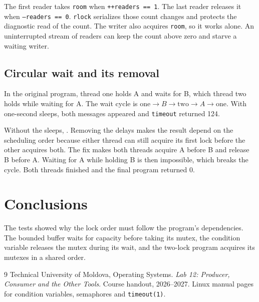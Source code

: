 The first reader takes \texttt{room} when \texttt{++readers == 1}. The last reader releases it when \texttt{--readers == 0}. \texttt{rlock} serializes those count changes and protects the diagnostic read of the count. The writer also acquires \texttt{room}, so it works alone. An uninterrupted stream of readers can keep the count above zero and starve a waiting writer.

\clearpage
\section{Circular wait and its removal}

In the original program, thread one holds A and waits for B, which thread two holds while waiting for A. The wait cycle is \(\mathrm{one}\to B\to\mathrm{two}\to A\to\mathrm{one}\). With one-second sleeps, both messages appeared and \texttt{timeout} returned 124.


Without the sleeps, \NoSleepResults. Removing the delays makes the result depend on the scheduling order because either thread can still acquire its first lock before the other acquires both. The fix makes both threads acquire A before B and release B before A. Waiting for A while holding B is then impossible, which breaks the cycle. Both threads finished and the final program returned 0.

\chapter{Conclusions}

The tests showed why the lock order must follow the program's dependencies. The bounded buffer waits for capacity before taking its mutex, the condition variable releases the mutex during its wait, and the two-lock program acquires its mutexes in a shared order.

\begin{thebibliography}{9}
 Technical University of Moldova, Operating Systems. \emph{Lab 12: Producer, Consumer and the Other Tools}. Course handout, 2026--2027.
 Linux manual pages for condition variables, semaphores and \texttt{timeout(1)}.
\end{thebibliography}
